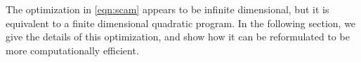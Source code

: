The optimization in \eqref{eqn:scam} appears to be infinite
dimensional, but it is equivalent to a finite dimensional quadratic
program.  In the following section, we give the details
of this optimization, and show how it can be reformulated
to be more computationally efficient.



